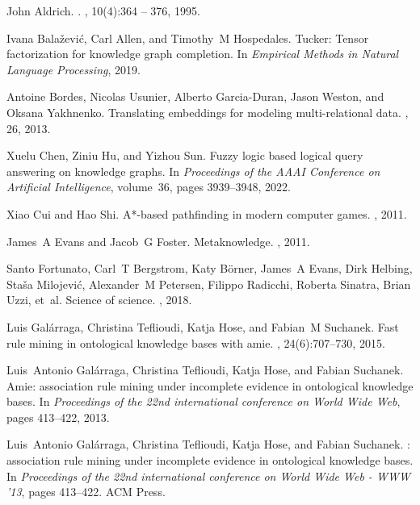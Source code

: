 \documentclass[11pt]{article}
\begin{document}
\begin{thebibliography}{10}

John Aldrich.
.
, 10(4):364 -- 376, 1995.

Ivana Bala\v{z}evi\'c, Carl Allen, and Timothy~M Hospedales.
\newblock Tucker: Tensor factorization for knowledge graph completion.
\newblock In {\em Empirical Methods in Natural Language Processing}, 2019.

Antoine Bordes, Nicolas Usunier, Alberto Garcia-Duran, Jason Weston, and Oksana
  Yakhnenko.
\newblock Translating embeddings for modeling multi-relational data.
, 26, 2013.

Xuelu Chen, Ziniu Hu, and Yizhou Sun.
\newblock Fuzzy logic based logical query answering on knowledge graphs.
\newblock In {\em Proceedings of the AAAI Conference on Artificial
  Intelligence}, volume~36, pages 3939--3948, 2022.

Xiao Cui and Hao Shi.
\newblock A*-based pathfinding in modern computer games.
,
  2011.

James~A Evans and Jacob~G Foster.
\newblock Metaknowledge.
, 2011.

Santo Fortunato, Carl~T Bergstrom, Katy B{\"o}rner, James~A Evans, Dirk
  Helbing, Sta{\v{s}}a Milojevi{\'c}, Alexander~M Petersen, Filippo Radicchi,
  Roberta Sinatra, Brian Uzzi, et~al.
\newblock Science of science.
, 2018.

Luis Gal{\'a}rraga, Christina Teflioudi, Katja Hose, and Fabian~M Suchanek.
\newblock Fast rule mining in ontological knowledge bases with amie.
, 24(6):707--730, 2015.

Luis~Antonio Gal{\'a}rraga, Christina Teflioudi, Katja Hose, and Fabian
  Suchanek.
\newblock Amie: association rule mining under incomplete evidence in
  ontological knowledge bases.
\newblock In {\em Proceedings of the 22nd international conference on World
  Wide Web}, pages 413--422, 2013.

Luis~Antonio Galárraga, Christina Teflioudi, Katja Hose, and Fabian Suchanek.
: association rule mining under incomplete evidence in
  ontological knowledge bases.
\newblock In {\em Proceedings of the 22nd international conference on World
  Wide Web - {WWW} '13}, pages 413--422. {ACM} Press.


\end{thebibliography}
\end{document}
